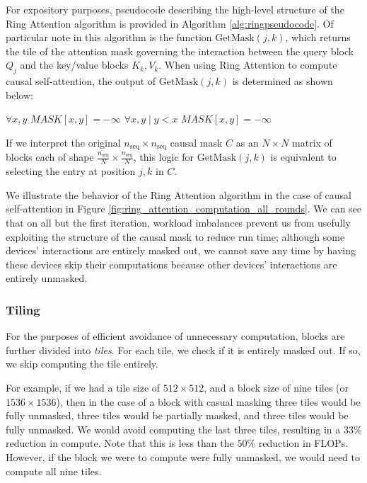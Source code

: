 For expository purposes, pseudocode describing the high-level structure of the Ring Attention algorithm is provided in Algorithm \ref{alg:ringpseudocode}. Of particular note in this algorithm is the function $\text{GetMask}(j, k)$, which returns the tile of the attention mask governing the interaction between the query block $Q_j$ and the key/value blocks $K_k, V_k$. When using Ring Attention to compute causal self-attention, the output of $\text{GetMask}(j, k)$ is determined as shown below:

\begin{samepage}
\hrulefill
    \begin{algorithmic}

            \State $\forall x,y \textit{ MASK}[x,y] = -\infty$
            \State $\forall x,y \mid y<x \textit{ MASK}[x,y] = -\infty$
        \EndIf

        \EndProcedure
    \end{algorithmic}
\hrulefill
\end{samepage}

If we interpret the original $n_\text{seq} \times n_\text{seq}$ causal mask $C$ as an $N \times N$ matrix of blocks each of shape $\frac{n_\text{seq}}{N} \times \frac{n_\text{seq}}{N}$, this logic for $\text{GetMask}(j, k)$ is equivalent to selecting the entry at position $j, k$ in $C$.

We illustrate the behavior of the Ring Attention algorithm in the case of causal self-attention in Figure \ref{fig:ring_attention_computation_all_rounds}. We can see that on all but the first iteration, workload imbalances prevent us from usefully exploiting the structure of the causal mask to reduce run time; although some devices' interactions are entirely masked out, we cannot save any time by having these devices skip their computations because other devices' interactions are entirely unmasked.

\subsubsection{Tiling} \label{tiledesc}
For the purposes of efficient avoidance of unnecessary computation, blocks are further divided into \textit{tiles}. 
For each tile, we check if it is entirely masked out. If so, we skip computing the tile entirely.

For example, if we had a tile size of $512 \times 512$, and a block size of nine tiles (or $1536 \times 1536$), then in the case of a block with casual masking three tiles would be fully unmasked, three tiles would be partially masked, and three tiles would be fully unmasked. We would avoid computing the last three tiles, resulting in a $33\%$ reduction in compute. Note that this is less than the $50\%$ reduction in FLOPs. However, if the block we were to compute were fully unmasked, we would need to compute all nine tiles.

